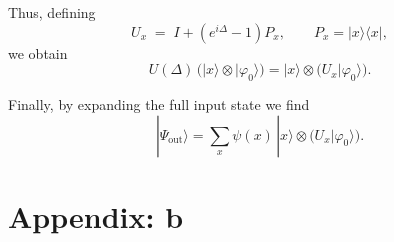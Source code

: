 \documentclass[12pt,a4paper]{article}
\begin{document}
Thus, defining
\begin{equation}
U_x \;=\; I + (e^{i\Delta}-1)P_x, 
\qquad P_x = |x\rangle\langle x| ,
\end{equation}
we obtain
\begin{equation}
U(\Delta)\,\big(|x\rangle \otimes |\varphi_0\rangle\big)
= |x\rangle \otimes \big(U_x|\varphi_0\rangle\big).
\end{equation}

Finally, by expanding the full input state we find
\begin{equation}
|\Psi_{\text{out}}\rangle = \sum_{x} \psi(x)\,|x\rangle \otimes \big(U_x|\varphi_0\rangle\big).
\end{equation}
\clearpage


\newpage
\section*{Appendix: b}
\end{document}
